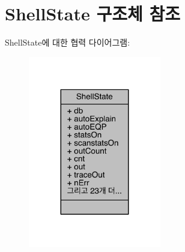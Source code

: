 \hypertarget{struct_shell_state}{}\section{Shell\+State 구조체 참조}
\label{struct_shell_state}


Shell\+State에 대한 협력 다이어그램\+:
\nopagebreak
\begin{figure}[H]
\begin{center}
\leavevmode
\includegraphics[width=164pt]{struct_shell_state__coll__graph}
\end{center}
\end{figure}
